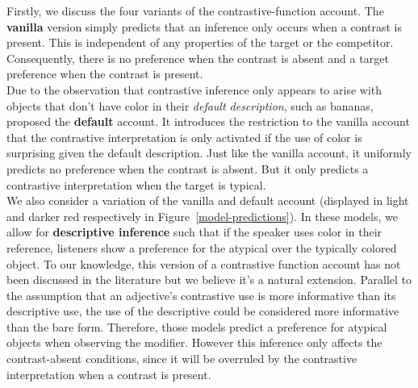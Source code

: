 \documentclass[a4paper,man,floatsintext,natbib]{apa6}
\newcommand{\figref}[1]{Figure~\ref{#1}}
\begin{document}
Firstly, we discuss the four variants of the contrastive-function account.
The \textbf{vanilla} version simply predicts that an inference only occurs when a contrast is present. This is independent of any properties of the target or the competitor. Consequently, there is no preference when the contrast is absent and a target preference when the contrast is present.\\
Due to the observation that contrastive inference only appears to arise with objects that don't have color in their \emph{default description}, such as bananas, \cite{Sedivy:2003} proposed the \textbf{default} account. It introduces the restriction to the vanilla account that the contrastive interpretation is only activated if the use of color is surprising given the default description. 
Just like the vanilla account, it uniformly predicts no preference when the contrast is absent. But it only predicts a contrastive interpretation when the target is typical.\\
We also consider a variation of the vanilla and default account (displayed in light and darker red respectively in \figref{model-predictions}). In these models, we allow for \textbf{descriptive inference} such that if the speaker uses color in their reference, listeners show a preference for the atypical over the typically colored object. To our knowledge, this version of a contrastive function account has not been discussed in the literature but we believe it's a natural extension. Parallel to the assumption that an adjective's contrastive use is more informative than its descriptive use, the use of the descriptive could be considered more informative than the bare form. Therefore, those models predict a preference for atypical objects when observing the modifier. However this inference only affects the contrast-absent conditions, since it will be overruled by the contrastive interpretation when a contrast is present.
\end{document}
